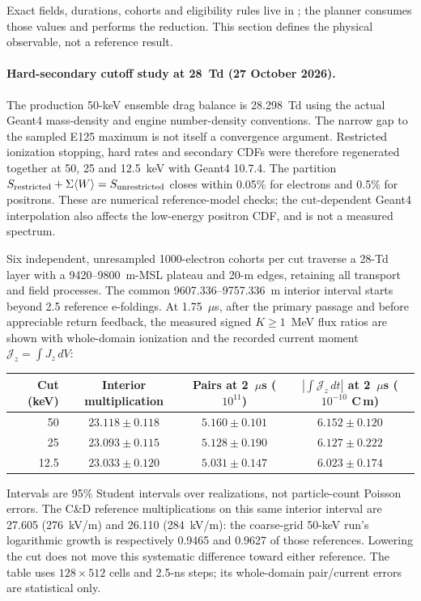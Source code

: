 \documentclass[11pt]{article}
\begin{document}
Exact fields, durations, cohorts and eligibility rules live in
; the planner consumes those values and
 performs the reduction.
This section defines the physical observable, not a reference result.

\paragraph{Hard-secondary cutoff study at 28~Td (27 October 2026).}
The production 50-keV ensemble drag balance is 28.298~Td using the actual
Geant4 mass-density and engine number-density conventions. The narrow gap
to the sampled E125 maximum is not itself a convergence argument.
Restricted ionization stopping, hard rates and secondary CDFs were therefore
regenerated together at 50, 25 and 12.5~keV with Geant4 10.7.4.
The partition $S_{\rm restricted}+\Sigma\langle W\rangle=S_{\rm unrestricted}$
closes within 0.05\% for electrons and 0.5\% for positrons. These are
numerical reference-model checks; the cut-dependent Geant4 interpolation
also affects the low-energy positron CDF, and is not a measured spectrum.

Six independent, unresampled 1000-electron cohorts per cut traverse a
28-Td layer with a 9420--9800~m-MSL plateau and 20-m edges, retaining all
transport and field processes. The common 9607.336--9757.336~m interior
interval starts beyond 2.5 reference e-foldings. At 1.75~$\mu$s, after the
primary passage and before appreciable return feedback, the measured
signed $K\ge1$~MeV flux ratios are shown with whole-domain ionization and
the recorded current moment $\mathcal{J}_z=\int J_z\,dV$:
\begin{center}
\begin{tabular}{rccc}
\toprule
Cut (keV) & Interior multiplication & Pairs at 2~$\mu$s ($10^{11}$)
 & $|\int\mathcal{J}_z\,dt|$ at 2~$\mu$s ($10^{-10}$ C\,m) \\
\midrule
50   & $23.118\pm0.118$ & $5.160\pm0.101$ & $6.152\pm0.120$ \\
25   & $23.093\pm0.115$ & $5.128\pm0.190$ & $6.127\pm0.222$ \\
12.5 & $23.033\pm0.120$ & $5.031\pm0.147$ & $6.023\pm0.174$ \\
\bottomrule
\end{tabular}
\end{center}
Intervals are 95\% Student intervals over realizations, not particle-count
Poisson errors. The C\&D reference multiplications on this same interior
interval are 27.605 (276~kV/m) and 26.110 (284~kV/m): the coarse-grid 50-keV run's
logarithmic growth is respectively 0.9465 and 0.9627 of those references.
Lowering the cut does not move this systematic difference toward either
reference. The table uses $128\times512$ cells and 2.5-ns steps; its
whole-domain pair/current errors are statistical only.
\end{document}
